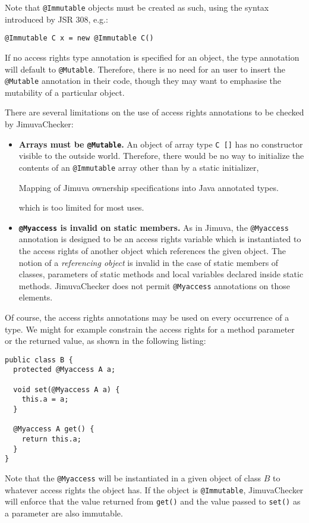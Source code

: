 \documentclass{pracamgr}
\theoremstyle{all}
\begin{document}
Note that \texttt{@Immutable} objects must be created as such, using
the syntax introduced by JSR 308, e.g.:
\begin{center}
  \texttt{@Immutable C x = new @Immutable C()}
\end{center}

If no access rights type annotation is specified for an object, the
type annotation will default to \texttt{@Mutable}. Therefore, there is
no need for an user to insert the \texttt{@Mutable} annotation in
their code, though they may want to emphasise the mutability of a
particular object.

There are several limitations on the use of access rights annotations
to be checked by JimuvaChecker:
\begin{itemize}
\item \textbf{Arrays must be \texttt{@Mutable}.} An object of array type
  \texttt{C []} has no constructor visible to the outside
  world. Therefore, there would be no way to initialize the contents
  of an \texttt{@Immutable} array other than by a static initializer,
  \begin{table}[htb]
    \centering

    \caption{Mapping of Jimuva ownership specifications into Java annotated types.}
    
  \end{table}
  which is too limited for most uses. 
\item \textbf{\texttt{@Myaccess} is invalid on static members.} As in
  Jimuva, the \texttt{@Myaccess} annotation is designed to be an
  access rights variable which is instantiated to the access rights of
  another object which references the given object. The notion of a
  \emph{referencing object} is invalid in the case of static members
  of classes, parameters of static methods and local variables
  declared inside static methods. JimuvaChecker does not permit
  \texttt{@Myaccess} annotations on those elements. 
\end{itemize}

Of course, the access rights annotations may be used on every
occurrence of a type. We might for example constrain the access rights
for a method parameter or the returned value, as shown in the
following listing:
\begin{lstlisting}
public class B {
  protected @Myaccess A a;

  void set(@Myaccess A a) {
    this.a = a;
  }

  @Myaccess A get() {
    return this.a;
  }
}
\end{lstlisting}
Note that the \texttt{@Myaccess} will be instantiated in a given
object of class $B$ to whatever access rights the object has. If the
object is \texttt{@Immutable}, JimuvaChecker will enforce that the
value returned from \texttt{get()} and the value passed to
\texttt{set()} as a parameter are also immutable.
\end{document}
